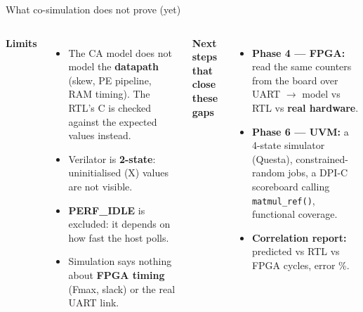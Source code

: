 \documentclass[aspectratio=169,11pt]{beamer}
\newcommand{\sig}[1]{\texttt{#1}}
\begin{document}
\begin{frame}{What co-simulation does not prove (yet)}
  \begin{columns}[T]
    \small
    \textbf{Limits}
    \begin{itemize}
      \item The CA model does not model the \textbf{datapath} (skew, PE pipeline, RAM timing). The
            RTL's C is checked against the expected values instead.
      \item Verilator is \textbf{2-state}: uninitialised (X) values are not visible.
      \item \textbf{PERF\_IDLE} is excluded: it depends on how fast the host polls.
      \item Simulation says nothing about \textbf{FPGA timing} (Fmax, slack) or the real UART link.
    \end{itemize}
    \small
    \textbf{Next steps that close these gaps}
    \begin{itemize}
      \item \textbf{Phase 4 --- FPGA:} read the same counters from the board over UART
            $\to$ model vs RTL vs \textbf{real hardware}.
      \item \textbf{Phase 6 --- UVM:} a 4-state simulator (Questa), constrained-random jobs,
            a DPI-C scoreboard calling \sig{matmul\_ref()}, functional coverage.
      \item \textbf{Correlation report:} predicted vs RTL vs FPGA cycles, error \%.
    \end{itemize}
  \end{columns}
\end{frame}
\end{document}
